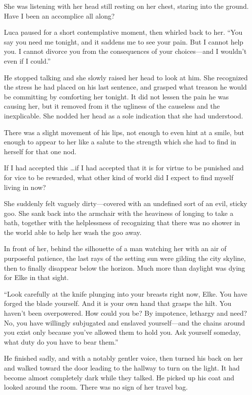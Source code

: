 She was listening with her head still resting on her chest, staring into the ground. Have I been an accomplice all along?

Luca paused for a short contemplative moment, then whirled back to her. ``You say you need me tonight, and it saddens me to see your pain. But I cannot help you. I cannot divorce you from the consequences of your choices---and I wouldn't even if I could.''

He stopped talking and she slowly raised her head to look at him. She recognized the stress he had placed on his last sentence, and grasped what treason he would be committing by comforting her tonight. It did not lessen the pain he was causing her, but it removed from it the ugliness of the causeless and the inexplicable. She nodded her head as a sole indication that she had understood.

There was a slight movement of his lips, not enough to even hint at a smile, but enough to appear to her like a salute to the strength which she had to find in herself for that one nod.

If I had accepted this \ldots if I had accepted that it is for virtue to be punished and for vice to be rewarded, what other kind of world did I expect to find myself living in now?

She suddenly felt vaguely dirty---covered with an undefined sort of an evil, sticky goo. She sank back into the armchair with the heaviness of longing to take a bath, together with the helplessness of recognizing that there was no shower in the world able to help her wash the goo away.

In front of her, behind the silhouette of a man watching her with an air of purposeful patience, the last rays of the setting sun were gilding the city skyline, then to finally disappear below the horizon. Much more than daylight was dying for Elke in that sight.

``Look carefully at the knife plunging into your breasts right now, Elke. You have forged the blade yourself. And it is your own hand that grasps the hilt. You haven't been overpowered. How could you be? By impotence, lethargy and need? No, you have willingly subjugated and enslaved yourself---and the chains around you exist only because you've allowed them to hold you. Ask yourself someday, what duty do you have to bear them.''

He finished sadly, and with a notably gentler voice, then turned his back on her and walked toward the door leading to the hallway to turn on the light. It had become almost completely dark while they talked. He picked up his coat and looked around the room. There was no sign of her travel bag.

